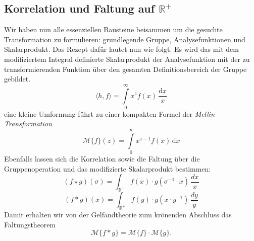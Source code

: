 \subsection{Korrelation und Faltung auf $\mathbb{R^+}$
\label{mellin:subsection:faltung}}
Wir haben nun alle essenziellen Bausteine beisammen um die gesuchte Transformation zu formulieren: grundlegende Gruppe, 
Analysefunktionen und Skalarprodukt.
Das Rezept dafür lautet nun wie folgt. Es wird das mit dem modifiziertem Integral definierte Skalarprodukt der Analysefunktion 
mit der zu transformierenden Funktion über den gesamten Definitionsbereich der Gruppe gebildet.
\begin{equation}
    \langle h,f \rangle = \int\limits_{0}^{\infty} x^{z} f(x) \,\frac{\mathrm{d}x}{x}
\end{equation}
eine kleine Umformung führt zu einer kompakten Formel der \emph{Mellin-Transformation}
\begin{equation}
    \mathcal{M}\{f \}(z) = \int\limits_{0}^{\infty} x^{z-1} f(x) \,\mathrm{d}x
    \label{mellin:mellin}
\end{equation}
Ebenfalls lassen sich die Korrelation sowie die Faltung über die Gruppenoperation und das modifizierte Skalarprodukt bestimmen:
\begin{equation}
    (f \star g)(\sigma ) = \int_\mathbb{R^+} f(x) \cdot g(\sigma ^{-1} \cdot x)\,\frac{dx}{x}
    \label{mellin:kreuzkorrelation*}
\end{equation}
\begin{equation}
    (f \ast g)(x) = \int_\mathbb{R^+} f(y) \cdot g(x \cdot y^{-1})\,\frac{dy}{y} 
\end{equation}
Damit erhalten wir von der Gelfandtheorie zum krönenden Abschluss das Faltungstheorem
\begin{equation}
    \mathcal{M}\{f \ast g\} = \mathcal{M}\{f\} \cdot \mathcal{M}\{g\}.
\end{equation}

